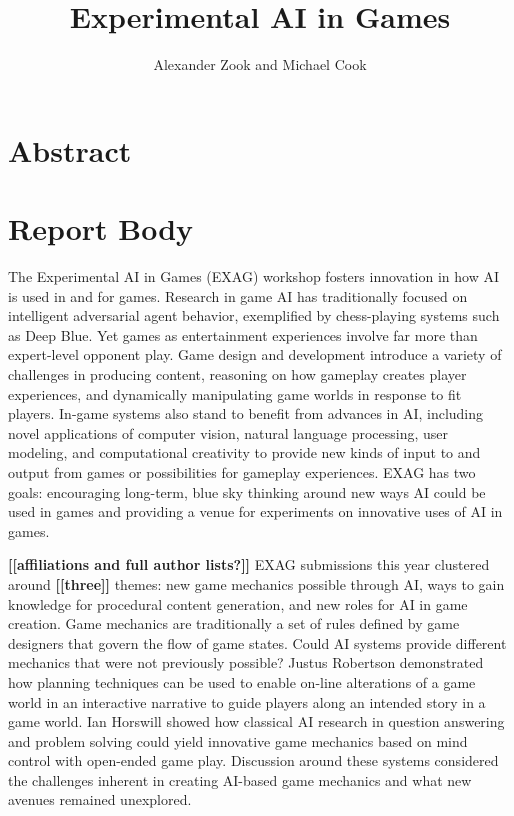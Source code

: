 \documentclass[10pt,a4paper]{article}
\author{Alexander Zook and Michael Cook}
\title{Experimental AI in Games}
\date{}
\newcommand{\mytodo}[1]{\textbf{[[#1]]}}
\begin{document}
\maketitle

\section*{Abstract}



\section*{Report Body}

The Experimental AI in Games (EXAG) workshop fosters innovation in how AI is used in and for games.
Research in game AI has traditionally focused on intelligent adversarial agent behavior, exemplified by chess-playing systems such as Deep Blue.
Yet games as entertainment experiences involve far more than expert-level opponent play.
Game design and development introduce a variety of challenges in producing content, reasoning on how gameplay creates player experiences, and dynamically manipulating game worlds in response to fit players.
In-game systems also stand to benefit from advances in AI, including novel applications of computer vision, natural language processing, user modeling, and computational creativity to provide new kinds of input to and output from games or possibilities for gameplay experiences.
EXAG has two goals: encouraging long-term, blue sky thinking around new ways AI could be used in games and providing a venue for experiments on innovative uses of AI in games.


\mytodo{affiliations and full author lists?}
EXAG submissions this year clustered around \mytodo{three} themes: new game mechanics possible through AI, ways to gain knowledge for procedural content generation, and new roles for AI in game creation.
Game mechanics are traditionally a set of rules defined by game designers that govern the flow of game states.
Could AI systems provide different mechanics that were not previously possible?
Justus Robertson demonstrated how planning techniques can be used to enable on-line alterations of a game world in an interactive narrative to guide players along an intended story in a game world.
Ian Horswill showed how classical AI research in question answering and problem solving could yield innovative game mechanics based on mind control with open-ended game play.
Discussion around these systems considered the challenges inherent in creating AI-based game mechanics and what new avenues remained unexplored.
\end{document}
